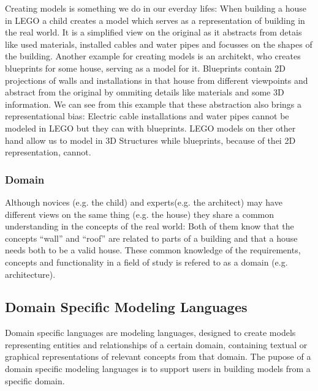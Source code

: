 \documentclass[runningheads,a4paper]{llncs}
\begin{document}
  Creating models is something we do in our everday lifes:
  When building a house in LEGO a child creates a model which serves as a representation of building in the real world.
  It is a simplified view on the original as it abstracts from detais like used materials, installed cables and water pipes and focusses
  on the shapes of the building.
  Another example for creating models is an architekt, who creates blueprints for some house, serving as a model for it.
  Blueprints contain 2D projections of walls and installations in that house from different viewpoints and abstract from the original by ommiting
  details like materials and some 3D information. 
  We can see from this example that these abstraction also brings a representational bias:
  Electric cable installations and water pipes cannot be modeled in LEGO but they can with blueprints.
  LEGO models on ther other hand allow us to model in 3D Structures while blueprints, because of thei 2D representation, cannot.
  
\subsubsection{Domain}
  
  Although novices (e.g. the child) and experts(e.g. the architect) may have different views on the same thing (e.g. the house)
  they share a common understanding in the concepts of the real world: 
  Both of them know that the concepts ``wall'' and ``roof'' are related to parts of a building and that a house needs both to be a valid house.
  These common knowledge of the requirements, concepts and functionality in a field of study is refered to as a domain (e.g. architecture). 
  
  
 \subsection{Domain Specific Modeling Languages}
 Domain specific languages are modeling languages, designed to create models representing entities and relationships of a certain domain,
 containing textual or graphical representations of relevant concepts from that domain. The pupose of a domain specific modeling languages
 is to support users in building models from a specific domain.
 
\end{document}
